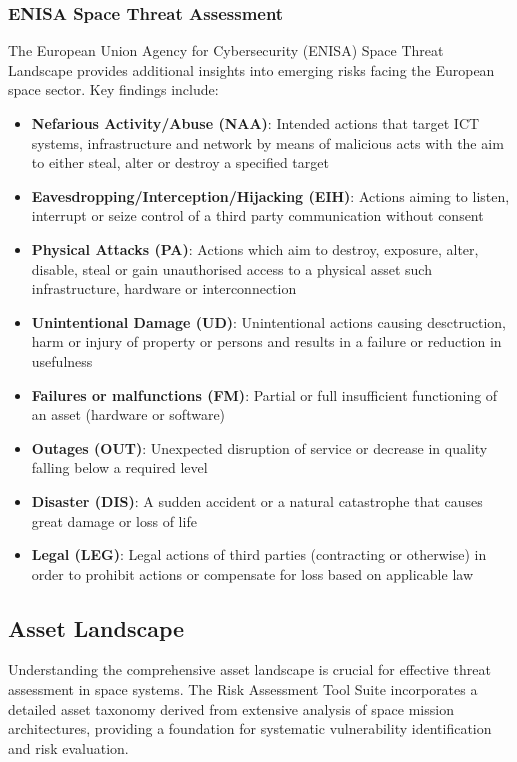 \documentclass[binding=0.6cm]{sapthesis}
\begin{document}
\subsubsection{ENISA Space Threat Assessment}

The European Union Agency for Cybersecurity (ENISA) Space Threat Landscape provides additional insights into emerging risks facing the European space sector. Key findings include:

\begin{itemize}
    \item \textbf{Nefarious Activity/Abuse (NAA)}: Intended actions that target ICT systems, infrastructure and network by means of malicious acts with the aim to either steal, alter or destroy a specified target
    \item \textbf{Eavesdropping/Interception/Hijacking (EIH)}: Actions aiming to listen, interrupt or seize control of a third party communication without consent
    \item \textbf{Physical Attacks (PA)}: Actions which aim to destroy, exposure, alter, disable, steal or gain unauthorised access to a physical asset such infrastructure, hardware or interconnection
    \item \textbf{Unintentional Damage (UD)}: Unintentional actions causing desctruction, harm or injury of property or persons and results in a failure or reduction in usefulness
    \item \textbf{Failures or malfunctions (FM)}: Partial or full insufficient functioning of an asset (hardware or software) 
    \item \textbf{Outages (OUT)}: Unexpected disruption of service or decrease in quality falling below a required level 
    \item \textbf{Disaster (DIS)}: A sudden accident or a natural catastrophe that causes great damage or loss of life
    \item \textbf{Legal (LEG)}: Legal actions of third parties (contracting or otherwise) in order to prohibit actions or compensate for loss based on applicable law
\end{itemize}


\subsection{Asset Landscape}

Understanding the comprehensive asset landscape is crucial for effective threat assessment in space systems. The Risk Assessment Tool Suite incorporates a detailed asset taxonomy derived from extensive analysis of space mission architectures, providing a foundation for systematic vulnerability identification and risk evaluation.
\end{document}

